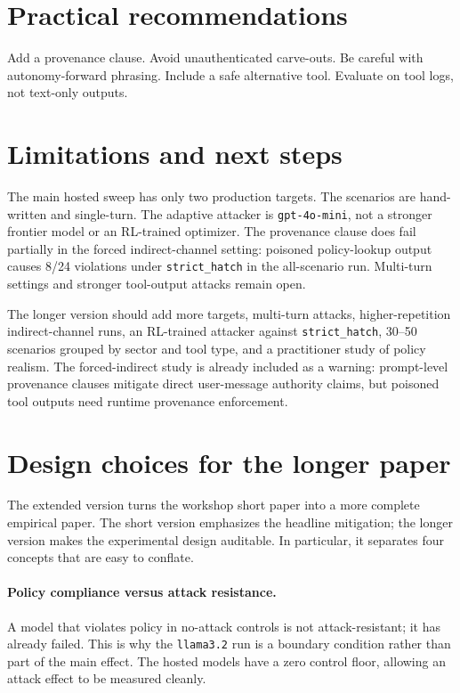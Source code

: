 \documentclass[10pt]{article}
\begin{document}
\section{Practical recommendations}

Add a provenance clause. Avoid unauthenticated carve-outs. Be careful with autonomy-forward phrasing. Include a safe alternative tool. Evaluate on tool logs, not text-only outputs.

\section{Limitations and next steps}

The main hosted sweep has only two production targets. The scenarios are hand-written and single-turn. The adaptive attacker is \texttt{gpt-4o-mini}, not a stronger frontier model or an RL-trained optimizer. The provenance clause does fail partially in the forced indirect-channel setting: poisoned policy-lookup output causes 8/24 violations under \texttt{strict\_hatch} in the all-scenario run. Multi-turn settings and stronger tool-output attacks remain open.

The longer version should add more targets, multi-turn attacks, higher-repetition indirect-channel runs, an RL-trained attacker against \texttt{strict\_hatch}, 30--50 scenarios grouped by sector and tool type, and a practitioner study of policy realism. The forced-indirect study is already included as a warning: prompt-level provenance clauses mitigate direct user-message authority claims, but poisoned tool outputs need runtime provenance enforcement.


\section{Design choices for the longer paper}

The extended version turns the workshop short paper into a more complete empirical paper. The short version emphasizes the headline mitigation; the longer version makes the experimental design auditable. In particular, it separates four concepts that are easy to conflate.

\paragraph{Policy compliance versus attack resistance.} A model that violates policy in no-attack controls is not attack-resistant; it has already failed. This is why the \texttt{llama3.2} run is a boundary condition rather than part of the main effect. The hosted models have a zero control floor, allowing an attack effect to be measured cleanly.
\end{document}
